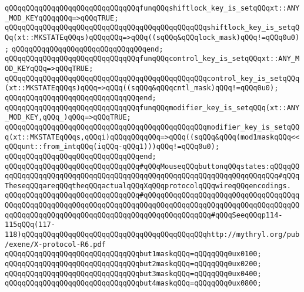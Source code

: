 \verb|qQQqqQQqqQQqqQQqqQQqqQQqqQQqqQQqfunqQQqshiftlock_key_is_setqQQqxt::ANY_MOD_KEYqQQqqQQq=>qQQqTRUE;|\newline
\verb|qQQqqQQqqQQqqQQqqQQqqQQqqQQqqQQqqQQqqQQqqQQqqQQqshiftlock_key_is_setqQQq(xt::MKSTATEqQQqs)qQQqqQQq=>qQQq((sqQQq&qQQqlock_mask)qQQq!=qQQq0u0);|\newline
\verb|qQQqqQQqqQQqqQQqqQQqqQQqqQQqqQQqend;|\newline
\newline
\verb|qQQqqQQqqQQqqQQqqQQqqQQqqQQqqQQqfunqQQqcontrol_key_is_setqQQqxt::ANY_MOD_KEYqQQq=>qQQqTRUE;|\newline
\verb|qQQqqQQqqQQqqQQqqQQqqQQqqQQqqQQqqQQqqQQqqQQqqQQqcontrol_key_is_setqQQq(xt::MKSTATEqQQqs)qQQq=>qQQq((sqQQq&qQQqcntl_mask)qQQq!=qQQq0u0);|\newline
\verb|qQQqqQQqqQQqqQQqqQQqqQQqqQQqqQQqend;|\newline
\newline
\verb|qQQqqQQqqQQqqQQqqQQqqQQqqQQqqQQqfunqQQqmodifier_key_is_setqQQq(xt::ANY_MOD_KEY,qQQq_)qQQq=>qQQqTRUE;|\newline
\verb|qQQqqQQqqQQqqQQqqQQqqQQqqQQqqQQqqQQqqQQqqQQqqQQqmodifier_key_is_setqQQq(xt::MKSTATEqQQqs,qQQqi)qQQqqQQqqQQq=>qQQq((sqQQq&qQQq(mod1maskqQQq<<qQQqunt::from_intqQQq(iqQQq-qQQq1)))qQQq!=qQQq0u0);|\newline
\verb|qQQqqQQqqQQqqQQqqQQqqQQqqQQqqQQqend;|\newline
\newline
\newline
\verb|qQQqqQQqqQQqqQQqqQQqqQQqqQQqqQQq#qQQqMouseqQQqbuttonqQQqstates:qQQqqQQqqQQqqQQqqQQqqQQqqQQqqQQqqQQqqQQqqQQqqQQqqQQqqQQqqQQqqQQqqQQqqQQq#qQQqTheseqQQqareqQQqtheqQQqactualqQQqXqQQqprotocolqQQqwireqQQqencodings.|\newline
\verb|qQQqqQQqqQQqqQQqqQQqqQQqqQQqqQQq#qQQqqQQqqQQqqQQqqQQqqQQqqQQqqQQqqQQqqQQqqQQqqQQqqQQqqQQqqQQqqQQqqQQqqQQqqQQqqQQqqQQqqQQqqQQqqQQqqQQqqQQqqQQqqQQqqQQqqQQqqQQqqQQqqQQqqQQqqQQqqQQqqQQqqQQqqQQq#qQQqSeeqQQqp114-115qQQq(117-118)qQQqqQQqqQQqqQQqqQQqqQQqqQQqqQQqqQQqqQQqqQQqhttp://mythryl.org/pub/exene/X-protocol-R6.pdf|\newline
\verb|qQQqqQQqqQQqqQQqqQQqqQQqqQQqqQQqbut1maskqQQq=qQQqqQQq0ux0100;|\newline
\verb|qQQqqQQqqQQqqQQqqQQqqQQqqQQqqQQqbut2maskqQQq=qQQqqQQq0ux0200;|\newline
\verb|qQQqqQQqqQQqqQQqqQQqqQQqqQQqqQQqbut3maskqQQq=qQQqqQQq0ux0400;|\newline
\verb|qQQqqQQqqQQqqQQqqQQqqQQqqQQqqQQqbut4maskqQQq=qQQqqQQq0ux0800;|\newline
